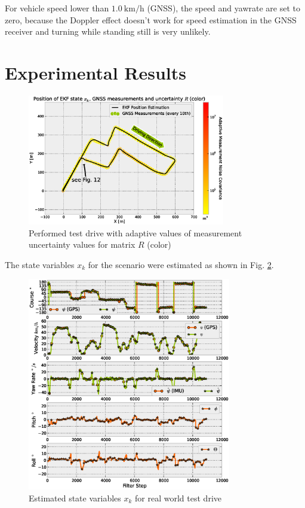 \documentclass[conference]{IEEEtran}
\begin{document}
For vehicle speed lower than $\SI{1,0}{\kilo\metre\per\hour}$ (GNSS), the speed and yawrate are set to zero, because the Doppler effect doesn't work for speed estimation in the GNSS receiver and turning while standing still is very unlikely.

\section{Experimental Results}

\begin{figure}[h!]
\centering
\includegraphics[width=3.4in]{images/Extended-Kalman-Filter-CTRV-Position}
\caption{Performed test drive with adaptive values of measurement uncertainty values for matrix $R$ (color)}
\label{ctrv-position}
\end{figure}

The state variables $x_k$ for the scenario were estimated as shown in Fig. \ref{ctrv-states}.

\begin{figure}[ht]
\centering
\includegraphics[width=3.5in]{images/Extended-Kalman-Filter-CTRV-Attitude-State-Estimates}
\caption{Estimated state variables $x_k$ for real world test drive}
\label{ctrv-states}
\end{figure}
\end{document}
